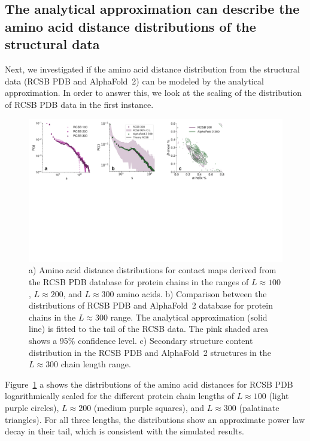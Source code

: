 \documentclass[10pt]{iopart}
\begin{document}
\subsection{The analytical approximation can describe the amino acid distance distributions of the structural data}
Next, we investigated if the amino acid distance distribution from the structural data (RCSB PDB and AlphaFold~2) can be modeled by the analytical approximation.
In order to answer this, we look at the scaling of the distribution of RCSB PDB data in the first instance. 


\begin{figure}[htb]
        \centering
	\includegraphics[width=\textwidth]{paper/figures/Fig4/Fig4.pdf}
        \caption{a) Amino acid distance distributions for contact maps derived from the RCSB PDB database for protein chains in the ranges of $L \approx 100$, $L\approx200$, and $L\approx300$ amino acids. b) Comparison between the distributions of RCSB PDB and AlphaFold~2 database for protein chains in the $L \approx 300$ range. The analytical approximation (solid line) is fitted to the tail of the RCSB data. The pink shaded area shows a 95\% confidence level. c) Secondary structure content distribution in the RCSB PDB and AlphaFold~2 structures in the $L\approx300$ chain length range.}
        \label{fig:sdd}
\end{figure}

Figure~\ref{fig:sdd} a shows the distributions of the amino acid distances for RCSB PDB logarithmically scaled for the different protein chain lengths of $L\approx100$ (light purple circles), $L\approx200$ (medium purple squares), and $L\approx300$ (palatinate triangles). For all three lengths, the distributions show an approximate power law decay in their tail, which is consistent with the simulated results. 
\end{document}
